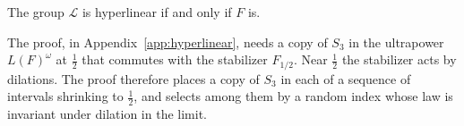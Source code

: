 \begin{proposition}\label{prop:thompson-hyperlinear}
The group $\mathcal L$ is hyperlinear if and only if $F$ is.
\end{proposition}

The proof, in Appendix~\ref{app:hyperlinear}, needs a copy of $S_3$ in the ultrapower $L(F)^\omega$ at $\frac12$ that commutes with the
stabilizer $F_{1/2}$. Near $\frac12$ the stabilizer acts by dilations. The proof therefore places a copy of $S_3$ in each of a sequence of
intervals shrinking to $\frac12$, and selects among them by a random index whose law is invariant under dilation in the limit.
